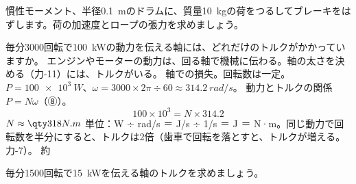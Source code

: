 \begin{jibun}
慣性モーメント、半径\qty{0.1}{m}のドラムに、質量\qty{10}{kg}の荷をつるしてブレーキをはずします。荷の加速度とロープの張力を求めましょう。
\end{jibun}

\begin{phreidai}[軸が伝える動力とトルク]
\label{ph:力-6:ex8}毎分3000回転で\qty{100}{kW}の動力を伝える軸には、どれだけのトルクがかかっていますか。
\phbamen
エンジンやモーターの動力は、回る軸で機械に伝わる。軸の太さを決める（力-11）には、トルクがいる。
\phmushi
軸での損失。回転数は一定。
\phzu
$P=\qty{100e3}{W}$、$\omega=3000\times2\pi\div60\approx\qty{314.2}{rad/s}$。
\phriyu
動力とトルクの関係 $P=N\omega$（⑧）。
\phtateru
\[ 100\times10^3=N\times314.2 \]
\phtoku
$N\approx\pxgNm{318}$
\phtashikame
単位：W ÷ rad/s ＝ J/s ÷ 1/s ＝ J ＝ N·m。\quad 同じ動力で回転数を半分にすると、トルクは2倍（歯車で回転を落とすと、トルクが増える。力-7）。
\kotae 約
\end{phreidai}
\begin{jibun}
毎分1500回転で\qty{15}{kW}を伝える軸のトルクを求めましょう。
\end{jibun}

